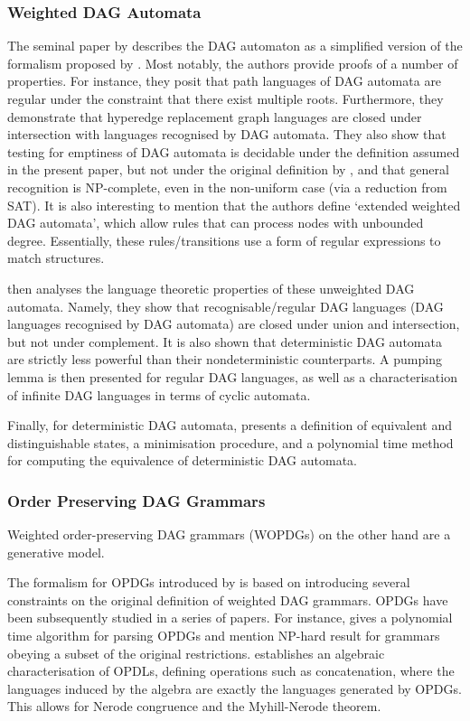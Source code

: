 \documentclass[11pt]{article}
\begin{document}
\subsubsection{Weighted DAG Automata}
The seminal paper by \cite{chiang2018weighted} describes the DAG automaton
as a simplified version of the formalism proposed by
\cite{quernheim2012dagger}. Most notably, the authors provide proofs of a
number of properties. For instance, they posit that path languages of DAG
automata are regular under the constraint that there exist multiple roots.
Furthermore, they demonstrate that hyperedge replacement graph languages are
closed under intersection with languages recognised by DAG automata. They also
show that testing for emptiness of DAG automata is decidable under the
definition assumed in the present paper, but not under the original definition
by \cite{kamimura1981parallel}, and that general recognition is
NP-complete, even in the non-uniform case (via a reduction from SAT). It is also
interesting to mention that the authors define `extended weighted DAG automata',
which allow rules that can process nodes with unbounded degree. Essentially,
these rules/transitions use a form of regular expressions to match structures.

\cite{blum2019properties} then analyses the language theoretic properties of
these unweighted DAG automata. Namely, they show that recognisable/regular DAG languages
(DAG languages recognised by DAG automata) are closed under union and
intersection, but not under complement. It is also shown that deterministic DAG
automata are strictly less powerful than their nondeterministic counterparts. A
pumping lemma is then presented for regular DAG languages, as well as a
characterisation of infinite DAG languages in terms of cyclic automata. 

Finally, for deterministic DAG automata, \cite{blum2019properties} presents a
definition of equivalent and distinguishable states, a minimisation procedure,
and a polynomial time method for computing the equivalence of deterministic DAG
automata. 

\subsubsection{Order Preserving DAG Grammars}
Weighted order-preserving DAG grammars
(WOPDGs) on the other hand are a generative model.

The formalism for OPDGs introduced by \cite{ericson2019order} is based on
introducing several constraints on the original definition of weighted DAG
grammars. OPDGs have been subsequently studied in a series of papers. For
instance, \cite{ericson1opdl} gives a polynomial time algorithm for parsing
OPDGs and mention NP-hard result for grammars obeying a subset of the original
restrictions. \cite{ericson2opdlregularity} establishes an algebraic
characterisation of OPDLs, defining operations such as concatenation, where the
languages induced by the algebra are exactly the languages generated by OPDGs.
This allows for Nerode congruence and the Myhill-Nerode theorem.
\end{document}
